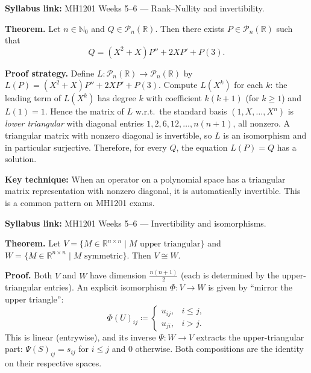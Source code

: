 \begin{extension}[title={Extension (Tutorial 6, Question 5): existence of polynomial solutions via triangularity}]
\textbf{Syllabus link:} MH1201 Weeks 5--6 — Rank--Nullity and invertibility.

\textbf{Theorem.} Let $n\in\mathbb{N}_0$ and $Q\in\mathcal{P}_n(\mathbb{R})$. Then there exists $P\in\mathcal{P}_n(\mathbb{R})$ such that
\[
Q=(X^2+X)P''+2XP'+P(3).
\]

\textbf{Proof strategy.}
Define $L:\mathcal{P}_n(\mathbb{R})\to\mathcal{P}_n(\mathbb{R})$ by $L(P)=(X^2+X)P''+2XP'+P(3)$.
Compute $L(X^k)$ for each $k$: the leading term of $L(X^k)$ has degree $k$ with coefficient $k(k+1)$ (for $k\ge 1$) and $L(1)=1$.
Hence the matrix of $L$ w.r.t.\ the standard basis $(1,X,\dots,X^n)$ is \emph{lower triangular} with diagonal entries $1,2,6,12,\dots,n(n+1)$, all nonzero.
A triangular matrix with nonzero diagonal is invertible, so $L$ is an isomorphism and in particular surjective. Therefore, for every $Q$, the equation $L(P)=Q$ has a solution.

\textbf{Key technique:} When an operator on a polynomial space has a triangular matrix representation with nonzero diagonal, it is automatically invertible. This is a common pattern on MH1201 exams.
\end{extension}

\begin{extension}[title={Extension (Tutorial 6, Question 6): isomorphism between upper-triangular and symmetric matrices}]
\textbf{Syllabus link:} MH1201 Weeks 5--6 — Invertibility and isomorphisms.

\textbf{Theorem.} Let $V=\{M\in\mathbb{R}^{n\times n}\mid M\text{ upper triangular}\}$ and $W=\{M\in\mathbb{R}^{n\times n}\mid M\text{ symmetric}\}$. Then $V\cong W$.

\textbf{Proof.} Both $V$ and $W$ have dimension $\frac{n(n+1)}{2}$ (each is determined by the upper-triangular entries).
An explicit isomorphism $\Phi:V\to W$ is given by ``mirror the upper triangle'':
\[
\Phi(U)_{ij}\coloneqq \begin{cases}u_{ij},& i\le j,\\u_{ji},& i>j.\end{cases}
\]
This is linear (entrywise), and its inverse $\Psi:W\to V$ extracts the upper-triangular part: $\Psi(S)_{ij}=s_{ij}$ for $i\le j$ and $0$ otherwise. Both compositions are the identity on their respective spaces.
\end{extension}

